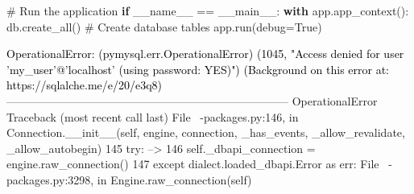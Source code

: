 \documentclass[
  letterpaper,
  DIV=11,
  numbers=noendperiod]{scrreprt}
\newenvironment{Shaded}{\begin{snugshade}}{\end{snugshade}}
\newcommand{\CommentTok}[1]{\textcolor[rgb]{0.37,0.37,0.37}{#1}}
\newcommand{\ControlFlowTok}[1]{\textcolor[rgb]{0.00,0.23,0.31}{\textbf{#1}}}
\newcommand{\NormalTok}[1]{\textcolor[rgb]{0.00,0.23,0.31}{#1}}
\newcommand{\OperatorTok}[1]{\textcolor[rgb]{0.37,0.37,0.37}{#1}}
\newcommand{\StringTok}[1]{\textcolor[rgb]{0.13,0.47,0.30}{#1}}
\newcommand{\VariableTok}[1]{\textcolor[rgb]{0.07,0.07,0.07}{#1}}
\begin{document}
\begin{Shaded}
\begin{Highlighting}[]
\CommentTok{\# Run the application}
\ControlFlowTok{if} \VariableTok{\_\_name\_\_} \OperatorTok{==} \StringTok{\textquotesingle{}\_\_main\_\_\textquotesingle{}}\NormalTok{:}
    \ControlFlowTok{with}\NormalTok{ app.app\_context():}
\NormalTok{        db.create\_all()  }\CommentTok{\# Create database tables}
\NormalTok{    app.run(debug}\OperatorTok{=}\VariableTok{True}\NormalTok{)}
\end{Highlighting}
\end{Shaded}

\begin{Highlighting}
\textcolor{black}{OperationalError: (pymysql.err.OperationalError) (1045, "Access denied for user 'my_user'@'localhost' (using password: YES)")}
\textcolor{black}{(Background on this error at: https://sqlalche.me/e/20/e3q8)}
\textcolor{black}{}\textcolor{QuartoInternalColor1}{---------------------------------------------------------------------------}\textcolor{QuartoInternalColor2}{}
\textcolor{QuartoInternalColor2}{}\textcolor{QuartoInternalColor1}{OperationalError}\textcolor{QuartoInternalColor2}{                          Traceback (most recent call last)}
\textcolor{QuartoInternalColor2}{File }\textcolor{QuartoInternalColor3}{~\Lib\site-packages\sqlalchemy\engine\base.py:146}\textcolor{QuartoInternalColor2}{, in }\textcolor{QuartoInternalColor4}{Connection.__init__}\textcolor{QuartoInternalColor5}{(self, engine, connection, _has_events, _allow_revalidate, _allow_autobegin)}\textcolor{QuartoInternalColor2}{}
\textcolor{QuartoInternalColor2}{}\textcolor{QuartoInternalColor6}{    145}\textcolor{QuartoInternalColor2}{ }\textcolor{QuartoInternalColor7}{try}\textcolor{QuartoInternalColor2}{:}
\textcolor{QuartoInternalColor2}{}\textcolor{QuartoInternalColor3}{--> 146}\textcolor{QuartoInternalColor2}{     }\textcolor{QuartoInternalColor7}{self}\textcolor{QuartoInternalColor2}{}\textcolor{QuartoInternalColor8}{.}\textcolor{QuartoInternalColor2}{_dbapi_connection }\textcolor{QuartoInternalColor8}{=}\textcolor{QuartoInternalColor2}{ engine}\textcolor{QuartoInternalColor8}{.}\textcolor{QuartoInternalColor2}{raw_connection()}
\textcolor{QuartoInternalColor2}{}\textcolor{QuartoInternalColor6}{    147}\textcolor{QuartoInternalColor2}{ }\textcolor{QuartoInternalColor7}{except}\textcolor{QuartoInternalColor2}{ dialect}\textcolor{QuartoInternalColor8}{.}\textcolor{QuartoInternalColor2}{loaded_dbapi}\textcolor{QuartoInternalColor8}{.}\textcolor{QuartoInternalColor2}{Error }\textcolor{QuartoInternalColor7}{as}\textcolor{QuartoInternalColor2}{ err:}
\textcolor{QuartoInternalColor2}{File }\textcolor{QuartoInternalColor3}{~\Lib\site-packages\sqlalchemy\engine\base.py:3298}\textcolor{QuartoInternalColor2}{, in }\textcolor{QuartoInternalColor4}{Engine.raw_connection}\textcolor{QuartoInternalColor5}{(self)}\textcolor{QuartoInternalColor2}{}

\end{Highlighting}
\end{document}
